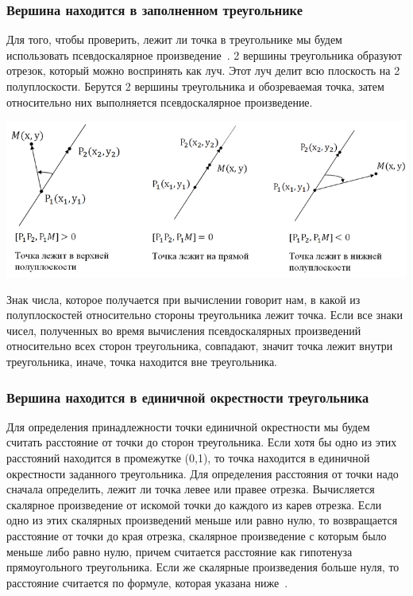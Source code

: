 \subsubsection*{Вершина находится в заполненном треугольнике}
  Для того, чтобы проверить, лежит ли точка в треугольнике мы будем использовать псевдоскалярное произведение~\cite{psevdoscalyar}. 2 вершины треугольника образуют отрезок, который можно воспринять как луч. Этот луч делит всю плоскость на 2 полуплоскости. Берутся 2 вершины треугольника и обозреваемая точка, затем относительно них выполняется псевдоскалярное произведение.
\begin{center}
\includegraphics[width=0.9\hsize]{images/psevd}
\end{center}
 Знак числа, которое получается при вычислении говорит нам, в какой из полуплоскостей относительно стороны треугольника лежит точка. Если все знаки чисел, полученных во время вычисления псевдоскалярных произведений относительно всех сторон треугольника, совпадают, значит точка лежит внутри треугольника, иначе, точка находится вне треугольника.
\subsubsection*{Вершина находится в единичной окрестности треугольника}
   Для определения принадлежности точки единичной окрестности мы будем считать расстояние от точки до сторон треугольника. Если хотя бы одно из этих расстояний находится в промежутке (0,1), то точка находится в единичной окрестности заданного треугольника. Для определения расстояния от точки надо сначала определить, лежит ли точка левее или правее отрезка. Вычисляется скалярное произведение от искомой точки до каждого из карев отрезка.
Если одно из этих скалярных произведений меньше или равно нулю, то возвращается расстояние от точки до края отрезка, скалярное произведение с которым было меньше либо равно нулю, причем считается расстояние как гипотенуза прямоугольного треугольника. Если же скалярные произведения больше нуля, то расстояние считается по формуле, которая указана ниже~\cite{rasst}.

